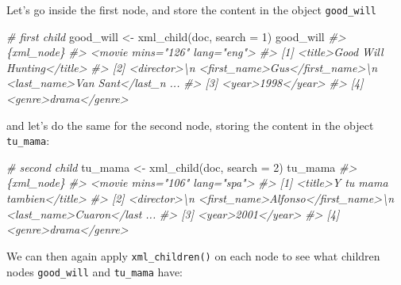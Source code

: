 \documentclass[
]{book}
\newenvironment{Shaded}{\begin{snugshade}}{\end{snugshade}}
\newcommand{\AttributeTok}[1]{\textcolor[rgb]{0.77,0.63,0.00}{#1}}
\newcommand{\CommentTok}[1]{\textcolor[rgb]{0.56,0.35,0.01}{\textit{#1}}}
\newcommand{\DecValTok}[1]{\textcolor[rgb]{0.00,0.00,0.81}{#1}}
\newcommand{\FunctionTok}[1]{\textcolor[rgb]{0.00,0.00,0.00}{#1}}
\newcommand{\NormalTok}[1]{#1}
\newcommand{\OtherTok}[1]{\textcolor[rgb]{0.56,0.35,0.01}{#1}}
\begin{document}
Let's go inside the first node, and store the content in the object
\texttt{good\_will}

\begin{Shaded}
\begin{Highlighting}[]
\CommentTok{\# first child}
\NormalTok{good\_will }\OtherTok{\textless{}{-}} \FunctionTok{xml\_child}\NormalTok{(doc, }\AttributeTok{search =} \DecValTok{1}\NormalTok{)}
\NormalTok{good\_will}
\CommentTok{\#\textgreater{} \{xml\_node\}}
\CommentTok{\#\textgreater{} \textless{}movie mins="126" lang="eng"\textgreater{}}
\CommentTok{\#\textgreater{} [1] \textless{}title\textgreater{}Good Will Hunting\textless{}/title\textgreater{}}
\CommentTok{\#\textgreater{} [2] \textless{}director\textgreater{}\textbackslash{}n  \textless{}first\_name\textgreater{}Gus\textless{}/first\_name\textgreater{}\textbackslash{}n  \textless{}last\_name\textgreater{}Van Sant\textless{}/last\_n ...}
\CommentTok{\#\textgreater{} [3] \textless{}year\textgreater{}1998\textless{}/year\textgreater{}}
\CommentTok{\#\textgreater{} [4] \textless{}genre\textgreater{}drama\textless{}/genre\textgreater{}}
\end{Highlighting}
\end{Shaded}

and let's do the same for the second node, storing the content in the object
\texttt{tu\_mama}:

\begin{Shaded}
\begin{Highlighting}[]
\CommentTok{\# second child}
\NormalTok{tu\_mama }\OtherTok{\textless{}{-}} \FunctionTok{xml\_child}\NormalTok{(doc, }\AttributeTok{search =} \DecValTok{2}\NormalTok{)}
\NormalTok{tu\_mama}
\CommentTok{\#\textgreater{} \{xml\_node\}}
\CommentTok{\#\textgreater{} \textless{}movie mins="106" lang="spa"\textgreater{}}
\CommentTok{\#\textgreater{} [1] \textless{}title\textgreater{}Y tu mama tambien\textless{}/title\textgreater{}}
\CommentTok{\#\textgreater{} [2] \textless{}director\textgreater{}\textbackslash{}n  \textless{}first\_name\textgreater{}Alfonso\textless{}/first\_name\textgreater{}\textbackslash{}n  \textless{}last\_name\textgreater{}Cuaron\textless{}/last ...}
\CommentTok{\#\textgreater{} [3] \textless{}year\textgreater{}2001\textless{}/year\textgreater{}}
\CommentTok{\#\textgreater{} [4] \textless{}genre\textgreater{}drama\textless{}/genre\textgreater{}}
\end{Highlighting}
\end{Shaded}

We can then again apply \texttt{xml\_children()} on each node to see what children
nodes \texttt{good\_will} and \texttt{tu\_mama} have:
\end{document}
